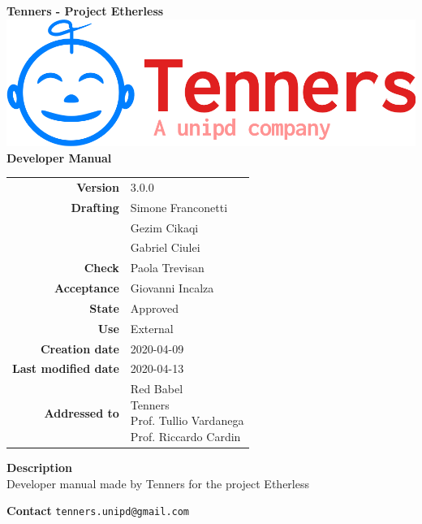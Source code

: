 \begin{titlepage}
	\begin{center}
		\large \textbf{Tenners - Project Etherless}
		\vfill
		\includegraphics[scale = 0.3]{./res/img/logo.png}\\
		\vfill
		\Huge \textbf{Developer Manual}

        \vfill
        \large

        \begin{tabular}{r|l}
                        \textbf{Version} & 3.0.0 \\
                        \textbf{Drafting} &
                        Simone Franconetti\\&
                        Gezim Cikaqi\\&
						Gabriel Ciulei\\
                        \textbf{Check} &
                        Paola Trevisan\\
                        \textbf{Acceptance} &
                        Giovanni Incalza\\
                        \textbf{State} & Approved \\
                        \textbf{Use} & External\\
                        \textbf{Creation date} &  2020-04-09\\
                        \textbf{Last modified date} &  2020-04-13\\
                        \textbf{Addressed to} & \parbox[t]{5cm}{Red Babel \\Tenners \\Prof. Tullio Vardanega \\Prof. Riccardo Cardin
                        							}
                \end{tabular}
                \vfill
                \normalsize
                \vfill
                                \textbf{Description}
                \\Developer manual made by Tenners for the project Etherless
                \vfill
                \normalsize
                \vfill
                
                \textbf{Contact}
                \texttt{tenners.unipd@gmail.com}

	\end{center}
\end{titlepage}
